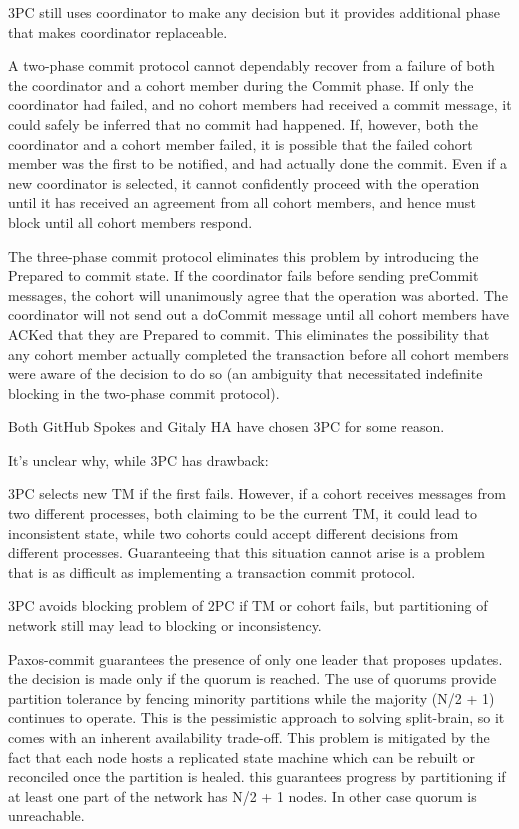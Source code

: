 \documentclass[acmlarge, screen, nonacm]{acmart}
\begin{document}
3PC still uses coordinator to make any decision but it provides additional phase that makes coordinator replaceable.

A two-phase commit protocol cannot dependably recover
from a failure of both the coordinator and a cohort member during the Commit phase.
If only the coordinator had failed, and no cohort members had received a commit message,
it could safely be inferred that no commit had happened.
If, however, both the coordinator and a cohort member failed,
it is possible that the failed cohort member was the first to be notified,
and had actually done the commit.
Even if a new coordinator is selected,
it cannot confidently proceed with the operation until it has received an agreement from all cohort members,
and hence must block until all cohort members respond.

The three-phase commit protocol eliminates this problem by introducing the Prepared to commit state.
If the coordinator fails before sending preCommit messages,
the cohort will unanimously agree that the operation was aborted.
The coordinator will not send out a doCommit message until all cohort members have ACKed that they are Prepared to commit.
This eliminates the possibility that any cohort member actually completed the transaction
before all cohort members were aware of the decision to do so (an ambiguity that necessitated indefinite blocking in the two-phase commit protocol).

Both GitHub Spokes and Gitaly HA have chosen 3PC for some reason.

It's unclear why, while 3PC has drawback:

3PC selects new TM if the first fails.
However, if a cohort receives messages from two different processes,
both claiming to be the current TM, it could lead to inconsistent state,
while two cohorts could accept different decisions from different processes.
Guaranteeing that this situation cannot arise is a problem
that is as difficult as implementing a transaction commit protocol.

3PC avoids blocking problem of 2PC if TM or cohort fails,
but partitioning of network still may lead to blocking or inconsistency.

Paxos-commit guarantees the presence of only one leader that proposes updates.
the decision is made only if the quorum is reached.
The use of quorums provide partition tolerance by fencing minority partitions while the majority (N/2 + 1) continues to operate.
This is the pessimistic approach to solving split-brain,
so it comes with an inherent availability trade-off.
This problem is mitigated by the fact that each node hosts a replicated state machine which can be rebuilt or reconciled once the partition is healed.
this guarantees progress by partitioning if at least one part of the network has N/2 + 1 nodes. In other case quorum is unreachable.
\end{document}
